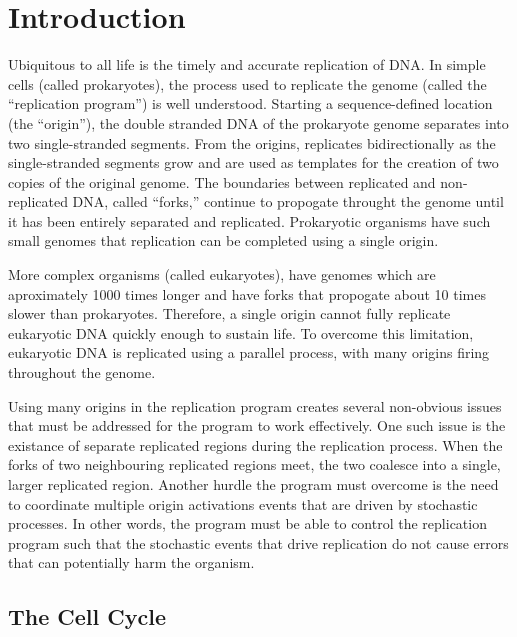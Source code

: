 \chapter{Introduction}

Ubiquitous to all life is the timely and accurate replication of DNA.
In simple cells (called prokaryotes), the process used to replicate the genome (called the ``replication program'') is well understood.
Starting a sequence-defined location (the ``origin''), the double stranded DNA of the prokaryote genome separates into two single-stranded segments.
From the origins, replicates bidirectionally as the single-stranded segments grow and are used as templates for the creation of two copies of the original genome.
The boundaries between replicated and non-replicated DNA, called ``forks,'' continue to propogate throught the genome until it has been entirely separated and replicated.
Prokaryotic organisms have such small genomes that replication can be completed using a single origin. \cite{MolecularCellBiology}

More complex organisms (called eukaryotes), have genomes which are aproximately 1000 times longer and have forks that propogate about 10 times slower than prokaryotes.
Therefore, a single origin cannot fully replicate eukaryotic DNA quickly enough to sustain life.
To overcome this limitation, eukaryotic DNA is replicated using a parallel process, with many origins firing throughout the genome.

Using many origins in the replication program creates several non-obvious issues that must be addressed for the program to work effectively.
One such issue is the existance of separate replicated regions during the replication process.
When the forks of two neighbouring replicated regions meet, the two coalesce into a single, larger replicated region.
Another hurdle the program must overcome is the need to coordinate multiple origin activations events that are driven by stochastic processes.
In other words, the program must be able to control the replication program such that the stochastic events that drive replication do not cause errors that can potentially harm the organism. \cite{eukaryotereview}


	\section{The Cell Cycle}
	
